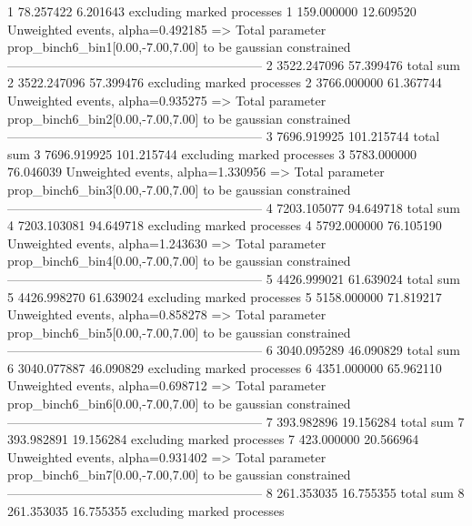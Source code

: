 1          78.257422       6.201643        excluding marked processes    
1          159.000000      12.609520       Unweighted events, alpha=0.492185
  => Total parameter prop_binch6_bin1[0.00,-7.00,7.00] to be gaussian constrained
------------------------------------------------------------
2          3522.247096     57.399476       total sum                     
2          3522.247096     57.399476       excluding marked processes    
2          3766.000000     61.367744       Unweighted events, alpha=0.935275
  => Total parameter prop_binch6_bin2[0.00,-7.00,7.00] to be gaussian constrained
------------------------------------------------------------
3          7696.919925     101.215744      total sum                     
3          7696.919925     101.215744      excluding marked processes    
3          5783.000000     76.046039       Unweighted events, alpha=1.330956
  => Total parameter prop_binch6_bin3[0.00,-7.00,7.00] to be gaussian constrained
------------------------------------------------------------
4          7203.105077     94.649718       total sum                     
4          7203.103081     94.649718       excluding marked processes    
4          5792.000000     76.105190       Unweighted events, alpha=1.243630
  => Total parameter prop_binch6_bin4[0.00,-7.00,7.00] to be gaussian constrained
------------------------------------------------------------
5          4426.999021     61.639024       total sum                     
5          4426.998270     61.639024       excluding marked processes    
5          5158.000000     71.819217       Unweighted events, alpha=0.858278
  => Total parameter prop_binch6_bin5[0.00,-7.00,7.00] to be gaussian constrained
------------------------------------------------------------
6          3040.095289     46.090829       total sum                     
6          3040.077887     46.090829       excluding marked processes    
6          4351.000000     65.962110       Unweighted events, alpha=0.698712
  => Total parameter prop_binch6_bin6[0.00,-7.00,7.00] to be gaussian constrained
------------------------------------------------------------
7          393.982896      19.156284       total sum                     
7          393.982891      19.156284       excluding marked processes    
7          423.000000      20.566964       Unweighted events, alpha=0.931402
  => Total parameter prop_binch6_bin7[0.00,-7.00,7.00] to be gaussian constrained
------------------------------------------------------------
8          261.353035      16.755355       total sum                     
8          261.353035      16.755355       excluding marked processes    
